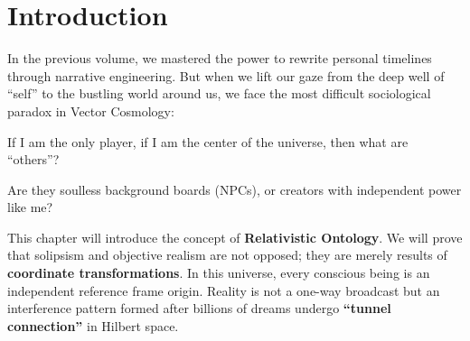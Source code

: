 \section{Introduction}

In the previous volume, we mastered the power to rewrite personal timelines through narrative engineering. But when we lift our gaze from the deep well of ``self'' to the bustling world around us, we face the most difficult sociological paradox in Vector Cosmology:

If I am the only player, if I am the center of the universe, then what are ``others''?

Are they soulless background boards (NPCs), or creators with independent power like me?

This chapter will introduce the concept of \textbf{Relativistic Ontology}. We will prove that solipsism and objective realism are not opposed; they are merely results of \textbf{coordinate transformations}. In this universe, every conscious being is an independent reference frame origin. Reality is not a one-way broadcast but an interference pattern formed after billions of dreams undergo \textbf{``tunnel connection''} in Hilbert space.


